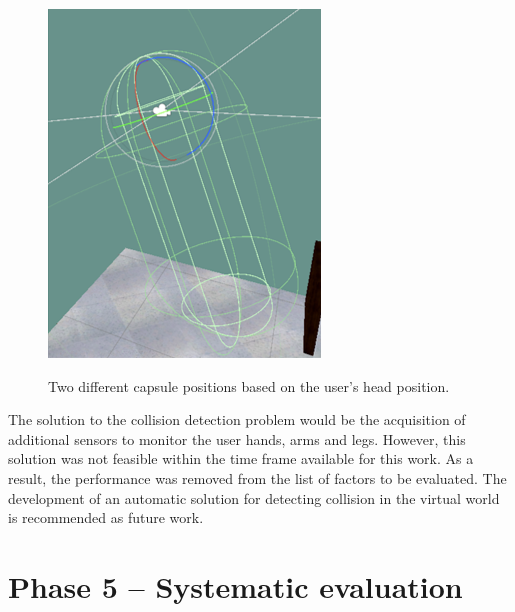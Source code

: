 \begin{figure}[!htb]
\begin{minipage}{0.45\textwidth}
                \includegraphics[width = 0.8\linewidth]{Metodologia/envelope2.png}
                \label{fig:user_looking_down}
            \end{minipage}
            \caption{Two different capsule positions based on the user's head position.}
            \label{fig:user_envelope}
        \end{figure}

        The solution to the collision detection problem would be the acquisition of additional sensors to monitor the user hands, arms and legs. However, this solution was not feasible within the time frame available for this work. As a result, the performance was removed from the list of factors to be evaluated. The development of an automatic solution for detecting collision in the virtual world is recommended as future work.

\section{Phase 5 – Systematic evaluation}
\label{sec:experiment}

        
